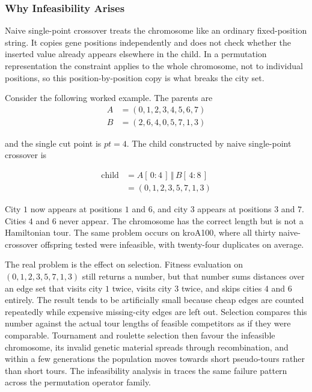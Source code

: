 \subsubsection{Why Infeasibility Arises}
\label{T2:Infeasibility}
Naive single-point crossover treats the chromosome like an ordinary
fixed-position string. It copies gene positions independently and does
not check whether the inserted value already appears elsewhere in the
child. In a permutation representation the constraint applies to the
whole chromosome, not to individual positions, so this position-by-position
copy is what breaks the city set.

Consider the following worked example. The parents are
\begin{align*}
A &= (0,1,2,3,4,5,6,7) \\
B &= (2,6,4,0,5,7,1,3)
\end{align*}

and the single cut point is $pt = 4$. The child constructed by naive
single-point crossover is

\begin{align*}
\mathrm{child} &= A[\,0{:}4\,] \,\Vert\, B[\,4{:}8\,] \\
&= (0,1,2,3,5,7,1,3)
\end{align*}

City $1$ now appears at positions $1$ and $6$, and city $3$ appears at
positions $3$ and $7$. Cities $4$ and $6$ never appear. The chromosome
has the correct length but is not a Hamiltonian tour. The same
problem occurs on kroA100, where all thirty naive-crossover offspring
tested were infeasible, with twenty-four duplicates on average.

The real problem is the effect on selection. Fitness evaluation
on $(0,1,2,3,5,7,1,3)$ still returns a number, but that number sums
distances over an edge set that visits city $1$ twice, visits city $3$
twice, and skips cities $4$ and $6$ entirely. The result tends to be
artificially small because cheap edges are counted repeatedly while
expensive missing-city edges are left out. Selection compares this
number against the actual tour lengths of feasible competitors as if
they were comparable. Tournament and roulette selection then favour the
infeasible chromosome, its invalid genetic material spreads through
recombination, and within a few generations the population moves towards
short pseudo-tours rather than short tours. The infeasibility analysis in
\cite{cicirello2023permutationoperators} traces the same failure pattern
across the permutation operator family.

